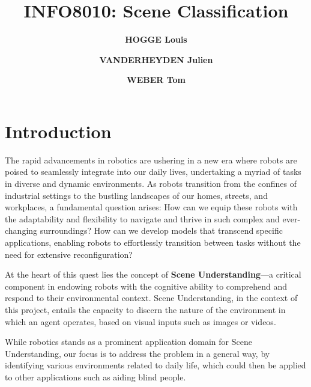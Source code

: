 \documentclass[twocolumn,superscriptaddress,aps]{revtex4-1}
\begin{document}

\title{\Large{INFO8010: Scene Classification}}
\vspace{1cm}
\author{\small{\bf HOGGE Louis}}
\author{\small{\bf VANDERHEYDEN Julien}}
\author{\small{\bf WEBER Tom}}

\maketitle


\section{Introduction}

The rapid advancements in robotics are ushering in a new era where robots are poised to seamlessly integrate into our daily lives, undertaking a myriad of tasks in diverse and dynamic environments. As robots transition from the confines of industrial settings to the bustling landscapes of our homes, streets, and workplaces, a fundamental question arises: How can we equip these robots with the adaptability and flexibility to navigate and thrive in such complex and ever-changing surroundings? How can we develop models that transcend specific applications, enabling robots to effortlessly transition between tasks without the need for extensive reconfiguration?

At the heart of this quest lies the concept of \textbf{Scene Understanding}—a critical component in endowing robots with the cognitive ability to comprehend and respond to their environmental context. Scene Understanding, in the context of this project, entails the capacity to discern the nature of the environment in which an agent operates, based on visual inputs such as images or videos.

While robotics stands as a prominent application domain for Scene Understanding, our focus is to address the problem in a general way, by identifying various environments related to daily life, which could then be applied to other applications such as aiding blind people.
\end{document}
